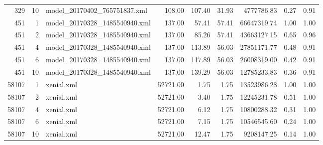 \begin{table}[ht]
\begin{tabular}{rrlrrrrrr}
  329 &  10 & model\_20170402\_765751837.xml & 108.00 & 107.40 & 31.93 & 4777786.83 & 0.27 & 0.91 \\ 
  451 &   1 & model\_20170328\_1485540940.xml & 137.00 & 57.41 & 57.41 & 66647319.74 & 1.00 & 1.00 \\ 
  451 &   2 & model\_20170328\_1485540940.xml & 137.00 & 85.26 & 57.41 & 43663127.15 & 0.65 & 0.96 \\ 
  451 &   4 & model\_20170328\_1485540940.xml & 137.00 & 113.89 & 56.03 & 27851171.77 & 0.48 & 0.91 \\ 
  451 &   6 & model\_20170328\_1485540940.xml & 137.00 & 117.89 & 56.03 & 26008319.00 & 0.42 & 0.91 \\ 
  451 &  10 & model\_20170328\_1485540940.xml & 137.00 & 139.29 & 56.03 & 12785233.83 & 0.36 & 0.91 \\ 
  58107 &   1 & xenial.xml & 52721.00 & 1.75 & 1.75 & 13523986.28 & 1.00 & 1.00 \\ 
  58107 &   2 & xenial.xml & 52721.00 & 3.40 & 1.75 & 12245231.78 & 0.51 & 1.00 \\ 
  58107 &   4 & xenial.xml & 52721.00 & 6.12 & 1.75 & 10800288.32 & 0.31 & 1.00 \\ 
  58107 &   6 & xenial.xml & 52721.00 & 7.15 & 1.75 & 10546545.60 & 0.24 & 1.00 \\ 
  58107 &  10 & xenial.xml & 52721.00 & 12.47 & 1.75 & 9208147.25 & 0.14 & 1.00 \\ 
   \hline
\end{tabular}
\end{table}
